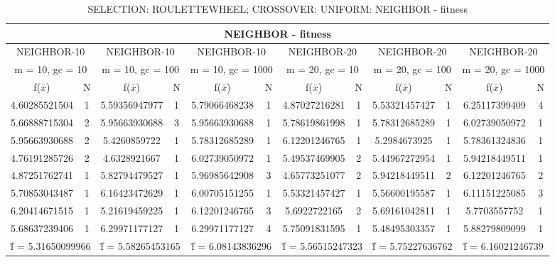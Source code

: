 \begin{table}[H]
	\centering
	\caption{SELECTION: ROULETTEWHEEL; CROSSOVER: UNIFORM: NEIGHBOR - fitness}
	\begin{adjustbox}{width=1\textwidth}
		\begin{tabular}{ |c|c||c|c||c|c||c|c||c|c||c|c| }
			\hline
			\multicolumn{12}{|c|}{NEIGHBOR - fitness} \\
			\hline
			\multicolumn{2}{|c||}{NEIGHBOR-10} & \multicolumn{2}{c||}{NEIGHBOR-10} & \multicolumn{2}{c||}{NEIGHBOR-10} & \multicolumn{2}{c||}{NEIGHBOR-20} & \multicolumn{2}{c||}{NEIGHBOR-20} & \multicolumn{2}{c|}{NEIGHBOR-20}\\
			\hline
			\multicolumn{2}{|c||}{m = 10, gc = 10} & \multicolumn{2}{c||}{m = 10, gc = 100} & \multicolumn{2}{c||}{m = 10, gc = 1000} & \multicolumn{2}{c||}{m = 20, gc = 10} & \multicolumn{2}{c||}{m = 20, gc = 100} & \multicolumn{2}{c|}{m = 20, gc = 1000}\\
			\hline
			f($\bar{x}$) & N & f($\bar{x}$) & N & f($\bar{x}$) & N & f($\bar{x}$) & N & f($\bar{x}$) & N & f($\bar{x}$) & N\\
			\hline
			\hline
			4.60285521504 & 1 & 5.59356947977 & 1 & 5.79066468238 & 1 & 4.87027216281 & 1 & 5.53321457427 & 1 & 6.25117399409 & 4\\
			5.66888715304 & 2 & 5.95663930688 & 3 & 5.95663930688 & 1 & 5.78619861998 & 1 & 5.78312685289 & 1 & 6.02739050972 & 1\\
			5.95663930688 & 2 & 5.4260859722 & 1 & 5.78312685289 & 1 & 6.12201246765 & 1 & 5.2984673925 & 1 & 5.78361324836 & 1\\
			4.76191285726 & 2 & 4.6328921667 & 1 & 6.02739050972 & 1 & 5.49537469905 & 2 & 5.44967272954 & 1 & 5.94218449511 & 1\\
			4.87251762741 & 1 & 5.82794479527 & 1 & 5.96985642908 & 3 & 4.65773251077 & 2 & 5.94218449511 & 2 & 6.12201246765 & 2\\
			5.70853043487 & 1 & 6.16423472629 & 1 & 6.00705151255 & 1 & 5.53321457427 & 1 & 5.56600195587 & 1 & 6.11151225085 & 3\\
			6.20414671515 & 1 & 5.21619459225 & 1 & 6.12201246765 & 3 & 5.6922722165 & 2 & 5.69161042811 & 1 & 5.7703557752 & 1\\
			5.68637239406 & 1 & 6.29971177127 & 1 & 6.29971177127 & 4 & 5.75091831595 & 1 & 5.48495303357 & 1 & 5.88279809099 & 1\\
			\hline
			\multicolumn{2}{|c||}{\^{f} = 5.31650099966} & \multicolumn{2}{c||}{\^{f} = 5.58265453165} & \multicolumn{2}{c||}{\^{f} = 6.08143836296} & \multicolumn{2}{c||}{\^{f} = 5.56515247323} & \multicolumn{2}{c||}{\^{f} = 5.75227636762} & \multicolumn{2}{c|}{\^{f} = 6.16021246739}\\
			\hline
		\end{tabular}
	\end{adjustbox}
\end{table}
